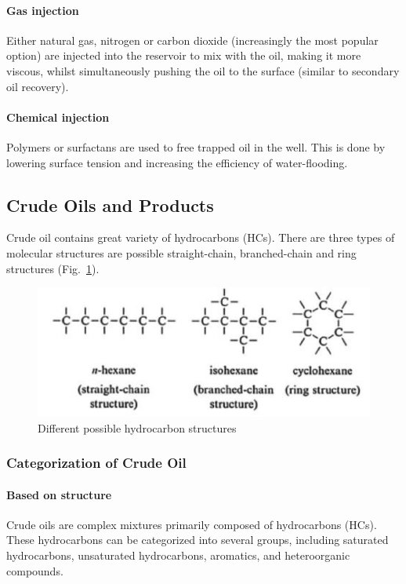 \paragraph{Gas injection} 
Either natural gas, nitrogen or carbon dioxide (increasingly the most popular option) are injected into the reservoir to mix with the oil, making it more viscous, whilst simultaneously pushing the oil to the surface (similar to secondary oil recovery).

\paragraph{Chemical injection}  
Polymers or surfactans are used to free trapped oil in the well.
This is done by lowering surface tension and increasing the efficiency of water-flooding.

\subsection{Crude Oils and Products}
\label{subsec:crude_oils_and_products}
Crude oil contains great variety of hydrocarbons (HCs).
There are three types of molecular structures are possible straight-chain, branched-chain and ring structures (Fig.~\ref{fig:hc_structs}).

\begin{figure}[H]
    \centering
    \includegraphics{Figures/HC_structures}
    \caption{Different possible hydrocarbon structures}
    \label{fig:hc_structs}
\end{figure}

\subsubsection{Categorization of Crude Oil}

\paragraph{Based on structure} Crude oils are complex mixtures primarily composed of hydrocarbons (HCs).
These hydrocarbons can be categorized into several groups, including saturated hydrocarbons, unsaturated hydrocarbons, aromatics, and heteroorganic compounds.

